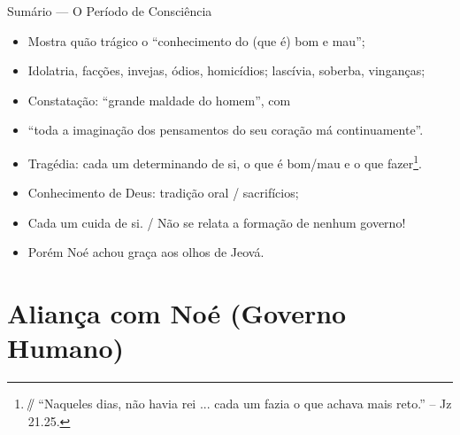 \documentclass[12pt,aspectratio=169]{beamer}
\newcommand{\parallelsum}{\mathbin{\!/\mkern-5mu/\!}} %
\newcommand{\RED}[1]{{\textcolor{TXred}{#1}}}
\newcommand{\ORA}[1]{{\textcolor{TXred!50!TXyel}{#1}}}
\newcommand{\YEL}[1]{{\textcolor{TXyel}{#1}}}
\newcommand{\GRE}[1]{{\textcolor{TXgre}{#1}}}
\newcommand{\BRI}[1]{{\textcolor{BSpbg}{#1}}}   %
\begin{document}
    \begin{frame}
        \par\noindent\hspace*{0.05\linewidth}%
        \begin{minipage}{0.9\linewidth}%
            \large%
            \begin{alertblock}{Sumário --- O Período de Consciência}
                \normalsize
                \begin{itemize}
                    \item<1-> Mostra quão trágico o ``\RED{conhecimento do (que é) bom e mau}'';
                    \item<1-> Idolatria, facções, invejas, ódios, homicídios; lascívia, soberba, vinganças;
                    \item<1-> Constatação: ``grande maldade \YEL{do homem}'', com
                    \item<1-> ``toda a imaginação dos pensamentos \YEL{do seu coração} má
                        continuamente''.
                    \item<2-> Tragédia: \RED{cada um determinando de si}, o que é \YEL{bom/mau}
                        e o que \GRE{fazer}\footnote{$\parallelsum$ ``Naqueles dias, \BRI{não
                        havia rei} ... \YEL{cada um} \GRE{fazia} o que \GRE{achava} mais
                        \YEL{reto}.'' -- Jz 21.25.}.
                    \item<2-> Conhecimento de Deus: \YEL{tradição oral} / \YEL{sacrifícios};
                    \item<2-> Cada um \RED{cuida de si}. / \ORA{Não se relata a formação de
                        nenhum governo}!
                    \item<2-> \GRE{Porém Noé achou graça aos olhos de Jeová}.
                \end{itemize}
            \end{alertblock}
        \end{minipage}%
    \end{frame}

\section{Aliança com Noé (Governo Humano)}
\end{document}
